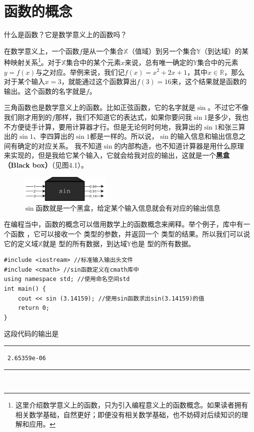 \section{函数的概念}
什么是函数？它是数学意义上的函数吗？\par
在数学意义上，一个函数$f$是从一个集合$\mathbb{X}$（值域）到另一个集合$\mathbb{Y}$（到达域）的某种映射关系\footnote{这里介绍数学意义上的函数，只为引入编程意义上的函数概念。如果读者拥有相关数学基础，自然更好；即便没有相关数学基础，也不妨碍对后续知识的理解和应用。}。对于$\mathbb{X}$集合中的某个元素$x$来说，总有唯一确定的$\mathbb{Y}$集合中的元素$y=f(x)$与之对应。举例来说，我们记$f(x)=x^2+2x+1$，其中$x\in\mathbb{R}$，那么对于某个输入$x=3$，就能通过这个函数算出$f(3)=16$来，这个结果就是函数的输出。这个函数的名字就是$f$。\par
三角函数也是数学意义上的函数。比如正弦函数，它的名字就是$\sin$。不过它不像我们刚才用到的$f$那样，我们不知道它的表达式，如果你要问我$\sin1$是多少，我也不方便徒手计算，要用计算器才行。但是无论何时何地，我算出的$\sin1$和张三算出的$\sin1$、李四算出的$\sin1$都是一样的。所以说，$\sin$的输入信息和输出信息之间有确定的对应关系。
我不知道$\sin$的内部构造，也不知道计算器是用什么原理来实现的，但是我给它某个输入，它就会给我对应的输出，这就是一个\textbf{黑盒（Black box）}（见图4.1）。\par
\begin{figure}[htbp]
    \centering
    \includegraphics[width=0.4\textwidth]{../images/generalized_parts/04_black_box.drawio.png}
    \caption{$\sin$函数就是一个黑盒，给定某个输入信息就会有对应的输出信息}
\end{figure}
在编程当中，函数的概念可以借用数学上的函数概念来阐释。举个例子，\lstinline@cmath@ 库中有一个函数 \lstinline@sin@，它可以接收一个 \lstinline@double@ 类型的参数，并返回一个 \lstinline@double@ 类型的结果。所以我们可以说它的定义域$\mathbb{X}$就是 \lstinline@double@ 型的所有数据，到达域$\mathbb{Y}$也是 \lstinline@double@ 型的所有数据。\par
\begin{lstlisting}
#include <iostream> //标准输入输出头文件
#include <cmath> //sin函数定义在cmath库中
using namespace std; //使用命名空间std
int main() {
    cout << sin (3.14159); //使用sin函数求出sin(3.14159)的值
    return 0;
}
\end{lstlisting}
这段代码的输出是\\\noindent\rule{\textwidth}{0.2pt}\texttt{
2.65359e-06
}\\\noindent\rule{\textwidth}{0.2pt}\\
